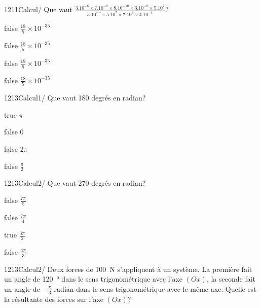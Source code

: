 \documentclass[11pt]{article}
\begin{document}
            \begin{question}{1211}{Calcul}{}{/}
                Que vaut $\frac{3.10^{-6}\times 7.10^{-8}\times 8.10^{-10}\times 3.10^{-8}\times 5.10^{2}}{5.10^{-4}\times 5.10^{7}\times 7.10^{3}\times 4.10^{-1}}$?
            \end{question}

            \begin{reponses}
                \item[false] $\frac{18}{5}\times 10^{-35}$
                \item[false] $\frac{18}{5}\times 10^{-35}$
                \item[false] $\frac{18}{5}\times 10^{-35}$
                \item[false] $\frac{18}{5}\times 10^{-35}$
            \end{reponses}

        	\begin{question}{1213}{Calcul}{1}{/}
				Que vaut 180 degrés en radian?
            \end{question}

            \begin{reponses}
            	\item[true] $\pi$
            	\item[false] 0
                \item[false] $2\pi$
                \item[false] $\frac{\pi}{2}$
            \end{reponses}

            \begin{question}{1213}{Calcul}{2}{/}
                Que vaut 270 degrés en radian?
            \end{question}

            \begin{reponses}
                \item[false] $\frac{7\pi}{5}$
                \item[false] $\frac{7\pi}{4}$
                \item[true] $\frac{3\pi}{2}$
                \item[false] $\frac{4\pi}{3}$
            \end{reponses}

            \begin{question}{1213}{Calcul}{2}{/}
                Deux forces de \SI{100}{\newton} s'appliquent à un système. La première fait un angle de \SI{+120}{\degree} dans le sens trigonométrique avec l'axe $(Ox)$, la seconde fait un angle de $-\frac{\pi}{3}$ radian dans le sens trigonométrique avec le même axe. Quelle est la résultante des forces sur l'axe $(Ox)$?
            \end{question}
\end{document}
